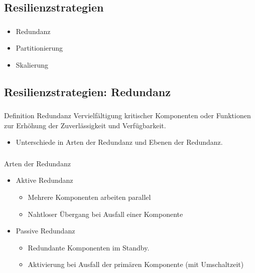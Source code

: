 \subsection{\textbf{Resilienzstrategien}}
\begin{frame}
    \frametitle{\insertsection}
    \framesubtitle{\insertsubsection}

    \begin{itemize}
        \item Redundanz
        \item Partitionierung
        \item Skalierung
    \end{itemize}
\end{frame}

\subsection{Resilienzstrategien: Redundanz}
\begin{frame}
    \frametitle{\insertsection}
    \framesubtitle{\insertsubsection}

    \begin{block}{Definition Redundanz}
        Vervielfältigung kritischer Komponenten oder Funktionen zur Erhöhung der Zuverlässigkeit und Verfügbarkeit.\\
        \begin{itemize}
            \item Unterschiede in Arten der Redundanz und Ebenen der Redundanz.
        \end{itemize}
    \end{block}
\end{frame}


\begin{frame}
    \frametitle{\insertsection}
    \framesubtitle{\insertsubsection}
    \begin{block}{Arten der Redundanz}
        \begin{itemize}
            \item Aktive Redundanz
                \begin{itemize}
                    \item Mehrere Komponenten arbeiten parallel
                    \item Nahtloser Übergang bei Ausfall einer Komponente
                \end{itemize}
            \item Passive Redundanz
                \begin{itemize}
                    \item Redundante Komponenten im Standby.
                    \item Aktivierung bei Ausfall der primären Komponente (mit Umschaltzeit)
                \end{itemize}
        \end{itemize}
    \end{block}


\end{frame}


